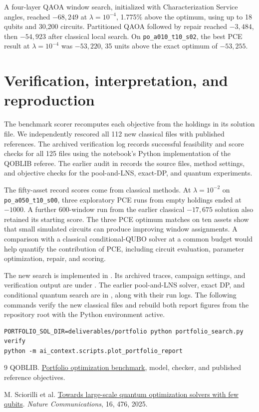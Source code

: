 \documentclass[a4paper]{article}
\begin{document}
A four-layer QAOA window search, initialized with Characterization Service angles, reached \(-68{,}249\)
at \(\lambda=10^{-4}\), 1.775\% above the optimum, using up to 18 qubits and 30,200 circuits.
Partitioned QAOA followed by repair reached \(-3{,}484\), then \(-54{,}923\) after classical local search.
On \texttt{po\_a010\_t10\_s02}, the best PCE result at \(\lambda=10^{-4}\) was \(-53{,}220\),
35 units above the exact optimum of \(-53{,}255\).

\clearpage
\section{Verification, interpretation, and reproduction}

The benchmark scorer recomputes each objective from the holdings in its solution file.
We independently rescored all 112 new classical files with published references.
The archived verification log records successful feasibility and score checks for all 125 files using the
notebook's Python implementation of the QOBLIB referee.
The earlier audit in  records the source files, method settings, and
objective checks for the pool-and-LNS, exact-DP, and quantum experiments.

The fifty-asset record scores come from classical methods. At \(\lambda=10^{-2}\) on
\texttt{po\_a050\_t10\_s00}, three exploratory PCE runs from empty holdings ended at \(-1000\).
A further 600-window run from the earlier classical \(-17{,}675\) solution also retained its starting score.
The three PCE optimum matches on ten assets show that small simulated circuits can produce improving window
assignments. A comparison with a classical conditional-QUBO solver at a common budget would help quantify
the contribution of PCE, including circuit evaluation, parameter optimization, repair, and scoring.

The new search is implemented in . Its archived traces, campaign settings, and
verification output are under .
The earlier pool-and-LNS solver, exact DP, and conditional quantum search are in ,
along with their run logs. The following commands verify the new classical files and rebuild both report figures
from the repository root with the Python environment active.
\begin{verbatim}
PORTFOLIO_SOL_DIR=deliverables/portfolio python portfolio_search.py verify
python -m ai_context.scripts.plot_portfolio_report
\end{verbatim}

\begin{thebibliography}{9}
QOBLIB.
\href{https://github.com/ZIB-AOPT/QOBLIB/tree/main/06-portfolio}{Portfolio optimization benchmark},
model, checker, and published reference objectives.

M. Sciorilli et al.
\href{https://doi.org/10.1038/s41467-024-55346-z}{Towards large-scale quantum optimization solvers with few qubits}.
\emph{Nature Communications}, 16, 476, 2025.
\end{thebibliography}
\end{document}
